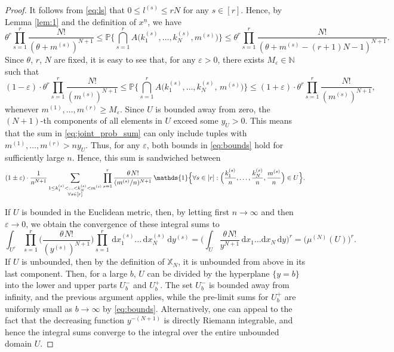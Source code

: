 \documentclass[11pt]{article}
\newcommand{\dd}{\mathrm d}
\newcommand{\hs}{\hspace{1pt}}
\newcommand{\X}{\mathbb{X}}
\newcommand{\N}{\mathbb{N}}
\newcommand{\1}[1][]{
	\ifx&#1&\mathds{1}
	\else\mathds{1}\left\{#1\right\}\fi}
\newcommand{\eps}{\varepsilon}
\theoremstyle{definition}
\theoremstyle{remark}
\numberwithin{equation}{section}
\begin{document}
	\begin{proof}
		It follows from \eqref{eq:ls} that $0\le l^{(s)}\le rN$ for any $s\in[r]$. Hence, by Lemma \ref{lem:1} and the definition of $x^{\underline n}$, we have
		\begin{equation*}
			\theta^r\prod_{s=1}^r \frac{N!}{\left(\theta + m^{(s)}\right)^{N+1}} \le 
			\mathbb{P}\biggl\{\bigcap_{s=1}^r A\bigl(k_1^{(s)},\dots, k_N^{(s)}, m^{(s)}\bigr)\biggr\} \le 
			\theta^r\prod_{s=1}^r\frac{N!}{\left(\theta+m^{(s)}-(r+1)N- 1\right)^{N+1}}.
		\end{equation*}
		Since $\theta$, $r$, $N$ are fixed, it is easy to see that, for any $\eps>0$, there exists $M_\eps\in\N$ such that
		\begin{equation}
			\label{eq:bounds}
			(1-\eps)\cdot\theta^r\prod_{s=1}^r\frac{N!}{(m^{(s)})^{N+1}}\le 
			\mathbb{P}\biggl\{\bigcap_{s=1}^r A\bigl(k_1^{(s)},\dots, k_N^{(s)},\, m^{(s)}\bigr)\biggr\} \le 
			(1+\eps)\cdot\theta^r\prod_{s=1}^r\frac{N!}{(m^{(s)})^{N+1}},
		\end{equation}
		whenever $m^{(1)},\ldots,m^{(r)}\ge M_\eps$.
		Since $U$ is bounded away from zero, the $(N+1)$-th components of all elements in $U$ exceed some $y_U>0$.
		This means that the sum in \eqref{eq:joint_prob_sum} can only include tuples with $m^{(1)},\ldots,m^{(r)}>ny_U$.
		Thus, for any $\eps$, both bounds in \eqref{eq:bounds} hold for sufficiently large $n$.
		Hence, this sum is sandwiched between
		\begin{equation*}
			(1\pm\eps)\cdot\frac{1}{n^{N+1}} \sum_{\substack{1\le k_1^{(s)}<\ldots<k_N^{(s)}<m^{(s)}\\\forall s\in [r]}}
			\prod_{s=1}^r\frac{\theta\hs N!}{(m^{(s)}/n)^{N+1}}\,
			\1{\Bigl\{\forall s\in [r]: \Bigl(\frac{k_1^{(s)}}{n},\ldots,\frac{k_N^{(s)}}{n}, \frac{m^{(s)}}{n}\Bigr)\in U\Bigr\}}.
		\end{equation*}
		
		If $U$ is bounded in the Euclidean metric, then, by letting first $n\to\infty$ and then $\eps\to0$,
		we obtain the convergence of these integral sums to        
		\begin{equation*}
			\int_{U^r} \prod_{s=1}^r\biggl(\frac{\theta\hs N!}{(y^{(s)})^{N+1}}\biggr)
			\prod_{s=1}^r\,\dd x_1^{(s)}\ldots\,\dd x_N^{(s)}\,\dd y^{(s)} = 
			\biggl(\int_U\frac{\theta\hs N!}{y^{N+1}}\,\dd x_1\ldots \dd x_N\,\dd y\biggr)^r = 
			\bigl(\mu^{(N)}(U)\bigr)^r.
		\end{equation*}
		If $U$ is unbounded, then by the definition of $\X_N$, it is unbounded from above in its last component.
		Then, for a large $b$, $U$ can be divided by the hyperplane $\{y=b\}$ into the lower and upper parts $U_b^-$ and $U_b^+$.
		The set $U_b^-$ is bounded away from infinity, and the previous argument applies, while the pre-limit sums for $U_b^+$
		are uniformly small as $b\to\infty$ by \eqref{eq:bounds}. Alternatively, one can appeal to the fact that the decreasing
		function $y^{-(N+1)}$ is directly Riemann integrable, and hence the integral sums converge to the integral over the entire unbounded domain $U$.    
	\end{proof}
	
\end{document}
